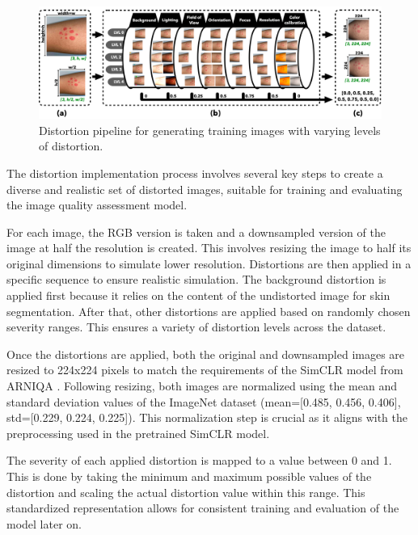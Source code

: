 \begin{figure}[ht]
    \centering
    \includegraphics[keepaspectratio,width=15cm]{img/Distortion_pipeline.png}
    \caption{Distortion pipeline for generating training images with varying levels of distortion.}
    \label{fig:DistPipeline}
\end{figure}

The distortion implementation process involves several key steps to create a diverse and realistic set of distorted images, suitable for training and evaluating the image quality assessment model. \par
\vspace{\baselineskip}
\noindent
For each image, the RGB version is taken and a downsampled version of the image at half the resolution is created. This involves resizing the image to half its original dimensions to simulate lower resolution. Distortions are then applied in a specific sequence to ensure realistic simulation. The background distortion is applied first because it relies on the content of the undistorted image for skin segmentation. After that, other distortions are applied based on randomly chosen severity ranges. This ensures a variety of distortion levels across the dataset. \par
\vspace{\baselineskip}
\noindent
Once the distortions are applied, both the original and downsampled images are resized to 224x224 pixels to match the requirements of the SimCLR model from ARNIQA \autocite{ARNIQA}. Following resizing, both images are normalized using the mean and standard deviation values of the ImageNet dataset (mean=[0.485, 0.456, 0.406], std=[0.229, 0.224, 0.225]). This normalization step is crucial as it aligns with the preprocessing used in the pretrained SimCLR model. \par
\vspace{\baselineskip}
\noindent
The severity of each applied distortion is mapped to a value between 0 and 1. This is done by taking the minimum and maximum possible values of the distortion and scaling the actual distortion value within this range. This standardized representation allows for consistent training and evaluation of the model later on. \par
